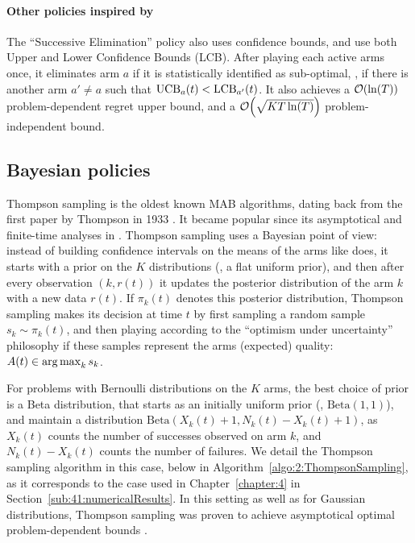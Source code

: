 \paragraph{Other policies inspired by \UCB}
%
The ``Successive Elimination'' policy also uses confidence bounds, and use both Upper and Lower Confidence Bounds (LCB).
After playing each active arms once, it eliminates arm $a$ if it is statistically identified as sub-optimal, \ie, if there is another arm $a' \neq a$ such that $\mathrm{UCB}_a(t) < \mathrm{LCB}_{a'}(t)$.
It also achieves a $\mathop{}\mathopen{}\mathcal{O}\mathopen{}\left(\ln(T)\right)$ problem-dependent regret upper bound, and a $\mathop{}\mathopen{}\mathcal{O}\mathopen{}\left(\sqrt{K T \ln(T)}\right)$ problem-independent bound.


\subsection{Bayesian policies}



Thompson sampling is the oldest known MAB algorithms, dating back from the first paper by Thompson in 1933 \cite{Thompson33}.
It became popular since its asymptotical and finite-time analyses in \cite{AgrawalGoyal11,Kaufmann12Thompson}.
%
Thompson sampling uses a Bayesian point of view:
instead of building confidence intervals on the means of the arms like \UCB{} does,
it starts with a prior on the $K$ distributions (\eg, a flat uniform prior), and then after every observation $(k, r(t))$ it updates the posterior distribution of the arm $k$ with a new data $r(t)$.
If $\pi_k(t)$ denotes this posterior distribution, Thompson sampling makes its decision at time $t$ by first sampling a random sample $s_k \sim \pi_k(t)$, and then playing according to the ``optimism under uncertainty'' philosophy if these samples represent the arms (expected) quality: $A(t) \in \operatorname*{arg\,max}_k s_k$.

For problems with Bernoulli distributions on the $K$ arms,
the best choice of prior is a Beta distribution, that starts as an initially uniform prior (\ie, $\mathrm{Beta}(1,1)$),
and maintain a distribution $\mathrm{Beta}(X_k(t)+1,N_k(t)-X_k(t)+1)$,
as $X_k(t)$ counts the number of successes observed on arm $k$, and $N_k(t)-X_k(t)$ counts the number of failures.
%
We detail the Thompson sampling algorithm in this case, below in Algorithm~\ref{algo:2:ThompsonSampling}, as it corresponds to the case used in Chapter~\ref{chapter:4} in Section~\ref{sub:41:numericalResults}.
%
In this setting as well as for Gaussian distributions,
Thompson sampling was proven to achieve asymptotical optimal problem-dependent bounds \cite{Kaufmann12Thompson,AgrawalGoyal11}.


